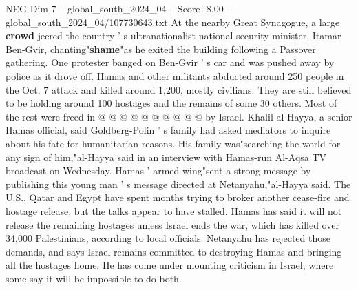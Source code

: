 \begin{textsample}{NEG Dim 7 – global\_south\_2024\_04 – Score -8.00 – global\_south\_2024\_04/107730643.txt}
At the nearby Great Synagogue, a large \textbf{crowd} jeered the country ' s ultranationalist national security minister, Itamar Ben-Gvir, chanting"\textbf{shame}"as he exited the building following a Passover gathering.
One protester banged on Ben-Gvir ' s car and was pushed away by police as it drove off.
Hamas and other militants abducted around 250 people in the Oct. 7 attack and killed around 1,200, mostly civilians.
They are still believed to be holding around 100 hostages and the remains of some 30 others.
Most of the rest were freed in @ @ @ @ @ @ @ @ @ @ by Israel.
Khalil al-Hayya, a senior Hamas official, said Goldberg-Polin ' s family had asked mediators to inquire about his fate for humanitarian reasons.
His family was"searching the world for any sign of him,"al-Hayya said in an interview with Hamas-run Al-Aqsa TV broadcast on Wednesday.
Hamas ' armed wing"sent a strong message by publishing this young man ' s message directed at Netanyahu,"al-Hayya said.
The U.S., Qatar and Egypt have spent months trying to broker another cease-fire and hostage release, but the talks appear to have stalled.
Hamas has said it will not release the remaining hostages unless Israel ends the war, which has killed over 34,000 Palestinians, according to local officials.
Netanyahu has rejected those demands, and says Israel remains committed to destroying Hamas and bringing all the hostages home.
He has come under mounting criticism in Israel, where some say it will be impossible to do both.

\end{textsample}
